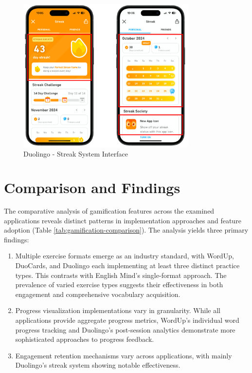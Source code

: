 \begin{itemize}
    \begin{figure}[!h]
        \includegraphics[width=0.8\textwidth]{src/figures/duolingo-streak.png}
        \caption{Duolingo - Streak System Interface}
        \label{fig:duolingo-daily-streak}
    \end{figure}
\end{itemize}

\section{Comparison and Findings}

The comparative analysis of gamification features across the examined applications reveals distinct patterns in implementation approaches and feature adoption (Table \ref{tab:gamification-comparison}). The analysis yields three primary findings:
\begin{enumerate}
    \item Multiple exercise formats emerge as an industry standard, with WordUp, DuoCards, and Duolingo each implementing at least three distinct practice types. This contrasts with English Mind's single-format approach. The prevalence of varied exercise types suggests their effectiveness in both engagement and comprehensive vocabulary acquisition.

    \item Progress visualization implementations vary in granularity. While all applications provide aggregate progress metrics, WordUp's individual word progress tracking and Duolingo's post-session analytics demonstrate more sophisticated approaches to progress feedback.
    
    \item Engagement retention mechanisms vary across applications, with mainly Duolingo's streak system showing notable effectiveness.
\end{enumerate}

